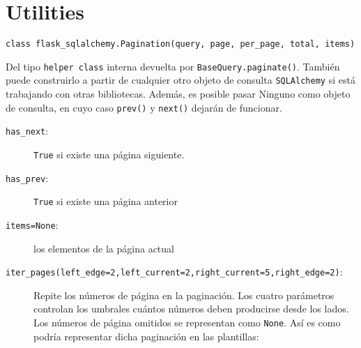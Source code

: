 \documentclass[11pt,letterpaper,notumble]{leaflet}
\begin{document}
{\begin{minipage}{1.6\linewidth}
            \section{Utilities}
            
            \texttt{class flask\_sqlalchemy.Pagination(query, page, per\_page, total, items)}
            
            Del tipo \texttt{helper class} interna devuelta por \texttt{BaseQuery.paginate()}. También puede construirlo a partir de cualquier otro objeto de consulta \texttt{SQLAlchemy} si está trabajando con otras bibliotecas. Además, es posible pasar Ninguno como objeto de consulta, en cuyo caso \texttt{prev()} y \texttt{next()} dejarán de funcionar.
            \begin{description}
                \item[\texttt{has\_next}:]
                \texttt{True} si existe una página siguiente.
                
                \item[\texttt{has\_prev}:]
                \texttt{True} si existe una página anterior
                
                \item[\texttt{items=None}:] 
                los elementos de la página actual
                
                \item[\texttt{iter\_pages(left\_edge=2,left\_current=2,right\_current=5,right\_edge=2)}:] Repite los números de página en la paginación. Los cuatro parámetros controlan los umbrales cuántos números deben producirse desde los lados. Los números de página omitidos se representan como \texttt{None}. Así es como podría representar dicha paginación en las plantillas:
            \end{description}
        \end{minipage}
    
    }
    
\end{document}
